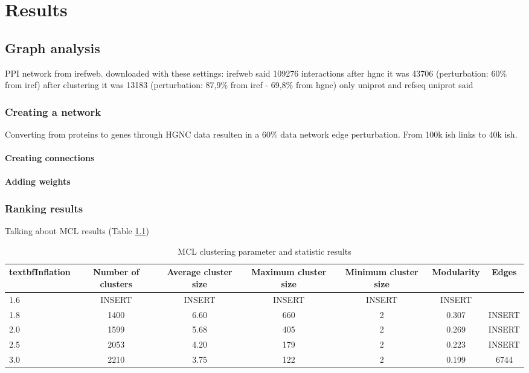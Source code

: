 \part{Results}
\label{pa:results}
\chapter{Graph analysis}
PPI network from irefweb.
downloaded with these settings: %
irefweb said 109276 interactions 
after hgnc it was 43706 (perturbation: 60\% from iref)
after clustering it was 13183 (perturbation: 87,9\% from iref - 69,8\% from hgnc) %
only uniprot and refseq
uniprot said
\section{Creating a network}
Converting from proteins to genes through HGNC data resulten in a 60\% data
network edge perturbation. From 100k ish links to 40k ish.
\subsection{Creating connections}
\subsection{Adding weights}
\section{Ranking results}
Talking about MCL results (Table \ref{tab:mcl-inflation})
\begin{table}
    \centering
    \begin{tabular}{| l | c | c | c | c | c | c |}
        \\textbf{Inflation} & \textbf{Number of clusters} & \textbf{Average
    cluster size} & \textbf{Maximum cluster size} & \textbf{Minimum cluster
    size} & \textbf{Modularity} & \textbf{Edges}\\
        \hline
        1.6 & INSERT & INSERT & INSERT & INSERT & INSERT \\
        1.8 & 1400 & 6.60 & 660 & 2 & 0.307 & INSERT \\
        2.0 & 1599 & 5.68 & 405 & 2 & 0.269 & INSERT \\
        2.5 & 2053 & 4.20 & 179 & 2 & 0.223 & INSERT \\
        3.0 & 2210 & 3.75 & 122 & 2 & 0.199 & 6744 \\
        \hline
    \end{tabular}
    \caption{MCL clustering parameter and statistic results}
    \label{tab:mcl-inflation}
\end{table}
